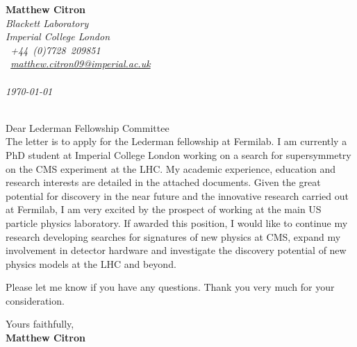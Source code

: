 \documentclass[12pt]{article}
\begin{document}
\sffamily   %
\hfill%
\begin{minipage}[t]{.6\textwidth}
\raggedleft%
{\bfseries Matthew Citron}\\[.35ex]
\small\itshape%
Blackett Laboratory\\ Imperial College London\\
\Telefon~+44~(0)7728~209851\\
\Letter~\href{mailto:matthew.citron09@imperial.ac.uk}{matthew.citron09@imperial.ac.uk}\\~\\

\today
\end{minipage}\\[1em]
%
\hfill %
Dear Lederman Fellowship Committee\\[1.5em]
%
The letter is to apply for the Lederman fellowship at Fermilab. I am currently a PhD 
student at Imperial College London working on a search for supersymmetry on the CMS
experiment at the LHC. My academic experience, education and research interests are
detailed in the attached documents. Given the great potential for discovery in the near future 
and the innovative research carried out at Fermilab, I am very excited by the prospect of 
working at the main US particle physics laboratory. If awarded this position, I 
would like to continue my research developing searches for signatures of new physics at CMS, 
expand my involvement in detector hardware and investigate the discovery potential of new physics models 
at the LHC and beyond. 

Please let me know if you have any questions. Thank you very much for your consideration.

Yours faithfully,\\[2em] %
%
{\bfseries Matthew Citron}\\
%
\vfill%
\end{document}

